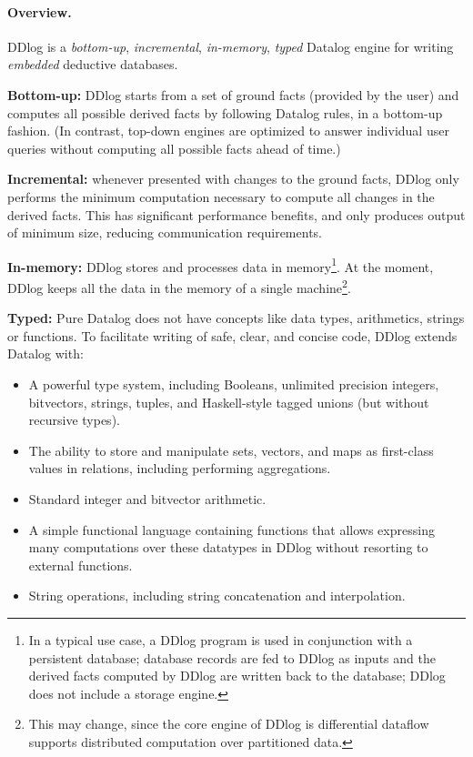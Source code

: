 \paragraph{Overview.}
DDlog is a \emph{bottom-up}, \emph{incremental}, \emph{in-memory}, \emph{typed} Datalog engine for
writing \emph{embedded} deductive databases.

\textbf{Bottom-up:} DDlog starts from a set of ground facts (provided
by the user) and computes all possible derived facts by following
Datalog rules, in a bottom-up fashion.  (In contrast, top-down engines
are optimized to answer individual user queries without computing all
possible facts ahead of time.)

\textbf{Incremental:} whenever presented with changes to the ground
facts, DDlog only performs the minimum computation necessary to
compute all changes in the derived facts.  This has significant
performance benefits, and only produces output of minimum size,
reducing communication requirements.

\textbf{In-memory:} DDlog stores and processes data in
memory\footnote{In a typical use case, a DDlog program is used in
  conjunction with a persistent database; database records are fed to
  DDlog as inputs and the derived facts computed by DDlog are written
  back to the database; DDlog does not include a storage engine.}.  At
the moment, DDlog keeps all the data in the memory of a single
machine\footnote{This may change, since the core engine of DDlog is
  differential dataflow~\cite{dd} supports distributed
  computation over partitioned data.}.

\textbf{Typed:} Pure Datalog does not have concepts like data types,
arithmetics, strings or functions.  To facilitate writing of safe,
clear, and concise code, DDlog extends Datalog with:
\begin{itemize}
\item A powerful type system, including Booleans, unlimited
  precision integers, bitvectors, strings, tuples, and
  Haskell-style tagged unions (but without recursive types).

\item The ability to store and manipulate sets, vectors, and maps as
  first-class values in relations, including performing aggregations.

\item Standard integer and bitvector arithmetic.

\item A simple functional language containing functions that allows
  expressing many computations over these datatypes in DDlog without
  resorting to external functions.

\item String operations, including string concatenation and
  interpolation.
\end{itemize}

